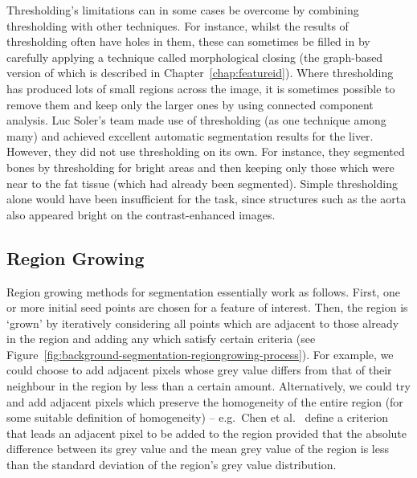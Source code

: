 \noindent Thresholding's limitations can in some cases be overcome by combining thresholding with other techniques. For instance, whilst the results of thresholding often have holes in them, these can sometimes be filled in by carefully applying a technique called morphological closing (the graph-based version of which is described in Chapter~\ref{chap:featureid}). Where thresholding has produced lots of small regions across the image, it is sometimes possible to remove them and keep only the larger ones by using connected component analysis. Luc Soler's team \cite{soler01} made use of thresholding (as one technique among many) and achieved excellent automatic segmentation results for the liver. However, they did not use thresholding on its own. For instance, they segmented bones by thresholding for bright areas and then keeping only those which were near to the fat tissue (which had already been segmented). Simple thresholding alone would have been insufficient for the task, since structures such as the aorta also appeared bright on the contrast-enhanced images.


\subsection{Region Growing}
\label{subsec:background-segmentation-regiongrowing}


Region growing methods for segmentation essentially work as follows. First, one or more initial seed points are chosen for a feature of interest. Then, the region is `grown' by iteratively considering all points which are adjacent to those already in the region and adding any which satisfy certain criteria (see Figure~\ref{fig:background-segmentation-regiongrowing-process}). For example, we could choose to add adjacent pixels whose grey value differs from that of their neighbour in the region by less than a certain amount. Alternatively, we could try and add adjacent pixels which preserve the homogeneity of the entire region (for some suitable definition of homogeneity) -- e.g.~Chen et al.\ \cite{chen09} define a criterion that leads an adjacent pixel to be added to the region provided that the absolute difference between its grey value and the mean grey value of the region is less than the standard deviation of the region's grey value distribution.

